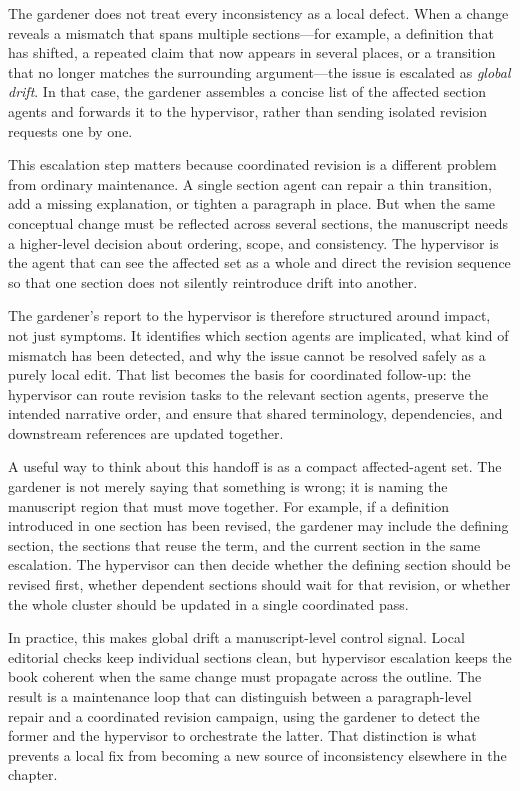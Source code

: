 The gardener does not treat every inconsistency as a local defect. When a change reveals a mismatch that spans multiple sections---for example, a definition that has shifted, a repeated claim that now appears in several places, or a transition that no longer matches the surrounding argument---the issue is escalated as \emph{global drift}. In that case, the gardener assembles a concise list of the affected section agents and forwards it to the hypervisor, rather than sending isolated revision requests one by one.

This escalation step matters because coordinated revision is a different problem from ordinary maintenance. A single section agent can repair a thin transition, add a missing explanation, or tighten a paragraph in place. But when the same conceptual change must be reflected across several sections, the manuscript needs a higher-level decision about ordering, scope, and consistency. The hypervisor is the agent that can see the affected set as a whole and direct the revision sequence so that one section does not silently reintroduce drift into another.

The gardener's report to the hypervisor is therefore structured around impact, not just symptoms. It identifies which section agents are implicated, what kind of mismatch has been detected, and why the issue cannot be resolved safely as a purely local edit. That list becomes the basis for coordinated follow-up: the hypervisor can route revision tasks to the relevant section agents, preserve the intended narrative order, and ensure that shared terminology, dependencies, and downstream references are updated together.

A useful way to think about this handoff is as a compact affected-agent set. The gardener is not merely saying that something is wrong; it is naming the manuscript region that must move together. For example, if a definition introduced in one section has been revised, the gardener may include the defining section, the sections that reuse the term, and the current section in the same escalation. The hypervisor can then decide whether the defining section should be revised first, whether dependent sections should wait for that revision, or whether the whole cluster should be updated in a single coordinated pass.

In practice, this makes global drift a manuscript-level control signal. Local editorial checks keep individual sections clean, but hypervisor escalation keeps the book coherent when the same change must propagate across the outline. The result is a maintenance loop that can distinguish between a paragraph-level repair and a coordinated revision campaign, using the gardener to detect the former and the hypervisor to orchestrate the latter. That distinction is what prevents a local fix from becoming a new source of inconsistency elsewhere in the chapter.

